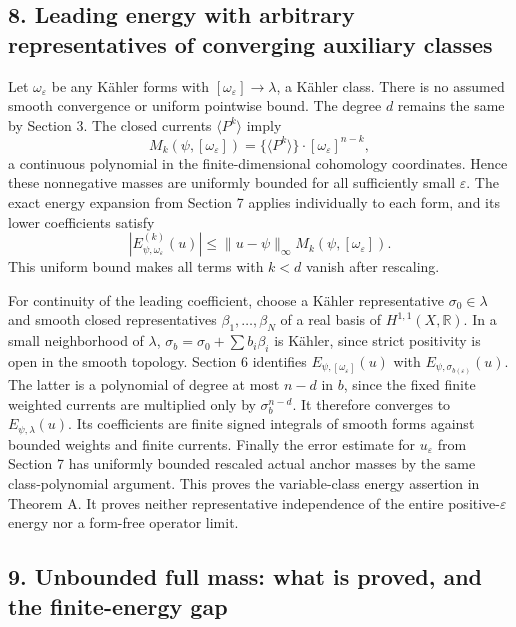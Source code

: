 \documentclass[
  10pt,
]{article}
\begin{document}
\subsection{8. Leading energy with arbitrary representatives of
converging auxiliary
classes}\label{leading-energy-with-arbitrary-representatives-of-converging-auxiliary-classes}

Let \(\omega_\varepsilon\) be any Kähler forms with
\([\omega_\varepsilon]\to\lambda\), a Kähler class. There is no assumed
smooth convergence or uniform pointwise bound. The degree \(d\) remains
the same by Section 3. The closed currents \(\langle P^k\rangle\) imply
\[
M_k(\psi,[\omega_\varepsilon])=
\{\langle P^k\rangle\}\cdot[\omega_\varepsilon]^{n-k},
\] a continuous polynomial in the finite-dimensional cohomology
coordinates. Hence these nonnegative masses are uniformly bounded for
all sufficiently small \(\varepsilon\). The exact energy expansion from
Section 7 applies individually to each form, and its lower coefficients
satisfy \[
|E^{(k)}_{\psi,\omega_\varepsilon}(u)|\leq\|u-\psi\|_\infty M_k(\psi,[\omega_\varepsilon]).
\] This uniform bound makes all terms with \(k<d\) vanish after
rescaling.

For continuity of the leading coefficient, choose a Kähler
representative \(\sigma_0\in\lambda\) and smooth closed representatives
\(\beta_1,\ldots,\beta_N\) of a real basis of \(H^{1,1}(X,\mathbb{R})\).
In a small neighborhood of \(\lambda\),
\(\sigma_b=\sigma_0+\sum b_i\beta_i\) is Kähler, since strict positivity
is open in the smooth topology. Section 6 identifies
\(E_{\psi,[\omega_\varepsilon]}(u)\) with
\(E_{\psi,\sigma_{b(\varepsilon)}}(u)\). The latter is a polynomial of
degree at most \(n-d\) in \(b\), since the fixed finite weighted
currents are multiplied only by \(\sigma_b^{n-d}\). It therefore
converges to \(E_{\psi,\lambda}(u)\). Its coefficients are finite signed
integrals of smooth forms against bounded weights and finite currents.
Finally the error estimate for \(u_\varepsilon\) from Section 7 has
uniformly bounded rescaled actual anchor masses by the same
class-polynomial argument. This proves the variable-class energy
assertion in Theorem A. It proves neither representative independence of
the entire positive-\(\varepsilon\) energy nor a form-free operator
limit.

\subsection{9. Unbounded full mass: what is proved, and the
finite-energy
gap}\label{unbounded-full-mass-what-is-proved-and-the-finite-energy-gap}
\end{document}
